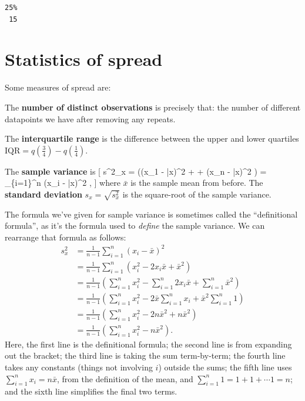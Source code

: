 \documentclass[
  letterpaper,
  DIV=11,
  numbers=noendperiod]{scrreprt}
\theoremstyle{remark}
\begin{document}
\begin{verbatim}
25% 
 15 
\end{verbatim}

\hypertarget{stat-spread}{%
\section{Statistics of spread}\label{stat-spread}}

Some measures of spread are:

The \textbf{number of distinct observations} is precisely that: the
number of different datapoints we have after removing any repeats.

The \textbf{interquartile range} is the difference between the upper and
lower quartiles \(\text{IQR} = q(\frac34) - q(\frac14)\).

The \textbf{sample variance} is {[} s\^{}2\_x = 
\left((x\_1 - \bar x)\^{}2 + \cdots + (x\_n - \bar x)\^{}2 \right) =
 \sum\_\{i=1\}\^{}n (x\_i - \bar x)\^{}2 , {]} where
\(\bar x\) is the sample mean from before. The \textbf{standard
deviation} \(s_x = \sqrt{s^2_x}\) is the square-root of the sample
variance.

The formula we've given for sample variance is sometimes called the
``definitional formula'', as it's the formula used to \emph{define} the
sample variance. We can rearrange that formula as follows:
\begin{align*}
  s^2_x &= \frac{1}{n-1} \sum_{i=1}^n (x_i - \bar x)^2 \\
      &= \frac{1}{n-1} \sum_{i=1}^n (x_i^2 - 2x_i\bar x + \bar x^2) \\
      &= \frac{1}{n-1}\left(\sum_{i=1}^nx_i^2 - \sum_{i=1}^n 2x_i\bar x + \sum_{i=1}^n\bar x^2 \right) \\
      &= \frac{1}{n-1} \left(\sum_{i=1}^n x_i^2 - 2\bar x \sum_{i=1}^n x_i + \bar x^2 \sum_{i=1}^n 1 \right) \\
      &= \frac{1}{n-1} \left(\sum_{i=1}^n x_i^2 - 2n\bar x^2 + n\bar x^2 \right) \\
      &= \frac{1}{n-1} \left(\sum_{i=1}^n x_i^2 -  n\bar x^2 \right) .
\end{align*} Here, the first line is the definitional formula; the
second line is from expanding out the bracket; the third line is taking
the sum term-by-term; the fourth line takes any constants (things not
involving \(i\)) outside the sums; the fifth line uses
\(\sum_{i=1}^n x_i = n\bar x\), from the definition of the mean, and
\(\sum_{i=1}^n 1 = 1 + 1 + \cdots 1 = n\); and the sixth line simplifies
the final two terms.
\end{document}
